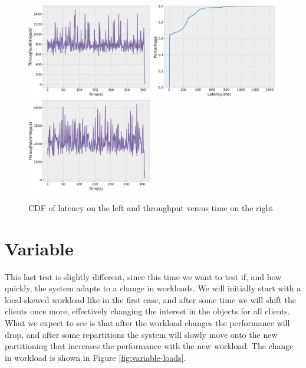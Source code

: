 \begin{figure}[H]
  \includegraphics[width=0.49\textwidth,height=\textheight,keepaspectratio]{img/constant5_tp.png}
  \includegraphics[width=0.49\textwidth,height=\textheight,keepaspectratio]{img/constant1_lat.png}
  \includegraphics[width=0.49\textwidth,height=\textheight,keepaspectratio]{img/constant1_tp.png}
  \caption{ CDF of latency on the left and throughput versus time on the right }
  \label{fig:constant50-performance}
\end{figure}
\newpage
\section{Variable}\label{sec:variable}
This last test is slightly different, since this time we want to test if, and how quickly, the system adapts to a change in workloads. We will initially start with a local-skewed workload like in the first case, and after some time we will shift the clients once more, effectively changing the interest in the objects for all clients. What we expect to see is that after the workload changes the performance will drop, and after some repartitions the system will slowly move onto the new partitioning that increases the performance with the new workload. The change in workload is shown in Figure \ref{fig:variable-loads}.

